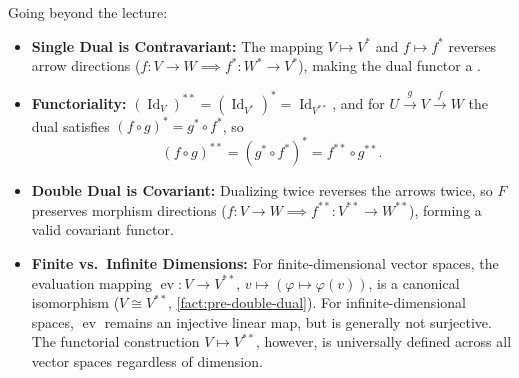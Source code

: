 \begin{content}
\begin{steps}
Going beyond the lecture:
\begin{itemize}
    \item \textbf{Single Dual is Contravariant:} The mapping $V \mapsto V^*$ and $f \mapsto f^*$ reverses arrow directions ($f \colon V \to W \implies f^* \colon W^* \to V^*$), making the dual functor a .
    \item \textbf{Functoriality:} $(\operatorname{Id}_V)^{**} = (\operatorname{Id}_{V^*})^* = \operatorname{Id}_{V^{**}}$, and for $U \xrightarrow{g} V \xrightarrow{f} W$ the dual satisfies $(f \circ g)^* = g^* \circ f^*$, so
    \[
    (f \circ g)^{**} = (g^* \circ f^*)^* = f^{**} \circ g^{**}.
    \]
    \item \textbf{Double Dual is Covariant:} Dualizing twice reverses the arrows twice, so $F$ preserves morphism directions ($f \colon V \to W \implies f^{**} \colon V^{**} \to W^{**}$), forming a valid covariant functor.
    \item \textbf{Finite vs.\ Infinite Dimensions:} For finite-dimensional vector spaces, the evaluation mapping $\operatorname{ev} \colon V \to V^{**}$, $v \mapsto (\varphi \mapsto \varphi(v))$, is a canonical isomorphism ($V \cong V^{**}$, \cref{fact:pre-double-dual}). For infinite-dimensional spaces, $\operatorname{ev}$ remains an injective linear map, but is generally not surjective. The functorial construction $V \mapsto V^{**}$, however, is universally defined across all vector spaces regardless of dimension.
\end{itemize}
\end{steps}
\end{content}

